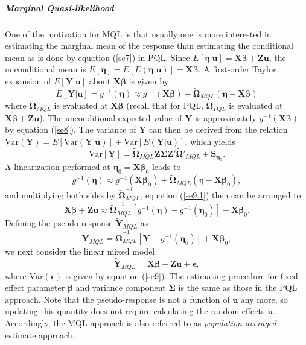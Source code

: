 \subparagraph*{Marginal Quasi-likelihood} 
One of the motivation for MQL is that usually one is more interested in estimating the marginal
mean of the response than estimating the conditional mean as is done by equation (\ref{se7}) in
PQL. Since $E[\bm \eta|\bm u]= \bm {X\beta} + \bm {Zu}$, the unconditional mean is $E[\bm \eta] =
E[E(\bm \eta|\bm u)]= \bm {X\beta}$. A first-order Taylor expansion of $E[\bm Y|\bm u]$ about $\bm X
\bm\beta$ is given by 
\begin{equation}\label{se8}
	E[\bm Y|\bm u] = g^{-1}(\bm \eta) \approx g^{-1} (\bm{X\beta}) + \tilde{\bm \Omega}_{MQL} (\bm
	\eta - \bm X\bm \beta)
\end{equation}
where $\tilde{\bm \Omega}_{MQL}$ is evaluated at $\bm {X\beta}$ (recall that for PQL, $\tilde{\bm
	\Omega}_{PQL}$ is evaluated at $\bm {X\beta} + \bm {Zu}$). The unconditional expected value of 
$\bm
Y$ is approximately $g^{-1}(\bm {X\beta})$ by equation (\ref{se8}). The variance of $\bm Y$ can then
be derived from the relation $\text{Var}(\bm Y)= E[\text{Var}(\bm Y|\bm u)] + \text{Var}[E(\bm Y|
\bm u)]$, which yields
\begin{equation}\label{se9}
	\text{Var}[\bm Y] = \tilde{\bm \Omega}_{MQL} \bm {Z\Sigma Z'}\tilde{\bm \Omega}'_{MQL} + \bm
	S_{\bm \eta_0}.
\end{equation}
A linearization performed at $\bm \eta_0= \bm X \bm \beta_0$ leads to 
\begin{equation}\label{se9.1}
	g^{-1}(\bm \eta) \approx g^{-1} (\bm{X\beta_0}) + \tilde{\bm \Omega}_{MQL} (\bm \eta - \bm X\bm
	\beta_0),
\end{equation}
and multiplying both sides by $\tilde{\bm \Omega}_{MQL} ^{-1}$, equation (\ref{se9.1}) then can be
arranged to 
\begin{equation}
\bm {X\beta} + \bm {Zu} \approx \tilde{\bm \Omega}_{MQL}^{-1}[g^{-1}(\bm\eta)- g^{-1}(\bm
\eta_0)]  + \bm{X}\bm \beta_0. 
\end{equation}
Defining the pseudo-response $\tilde{\bm Y}_{MQL}$ as
\begin{equation}\label{se10}
	\tilde{\bm Y}_{MQL} =  \tilde{\bm \Omega}_{MQL}^{-1}[\bm Y- g^{-1}(\bm \eta_0)]  + \bm{X}\bm
	\beta_0,  
\end{equation}
we next consider the linear mixed model 
\[ \tilde{\bm Y}_{MQL}  = \bm {X\beta}+ \bm {Zu}  + \bm \epsilon, \] 
where $\text{Var}(\bm \epsilon) $ is given by equation (\ref{se9}).  The estimating procedure for
fixed effect parameter $\bm \beta$ and variance component $\bm \Sigma$ is the same as those in the 
PQL approach.
Note that the pseudo-response is not a function of $\bm u$ any more, so updating this quantity does
not require calculating the random effects $\bm u$. Accordingly, the MQL approach is also referred 
to as \textit{population-averaged} estimate approach.

